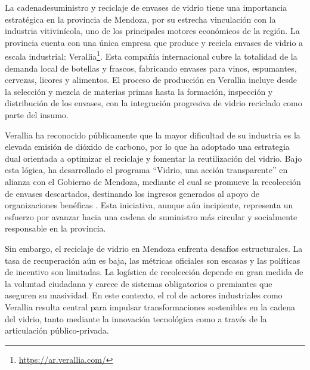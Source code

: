 La \gls{cadenadesuministro} y reciclaje de envases de vidrio tiene una importancia estratégica en la provincia de Mendoza, por su estrecha vinculación con la industria vitivinícola, uno de los principales motores económicos de la región. La provincia cuenta con una única empresa que produce y recicla envases de vidrio a escala industrial: Verallia\footnote{\url{https://ar.verallia.com/}}. Esta compañía internacional cubre la totalidad de la demanda local de botellas y frascos, fabricando envases para vinos, espumantes, cervezas, licores y alimentos. El proceso de producción en Verallia incluye desde la selección y mezcla de materias primas hasta la formación, inspección y distribución de los envases, con la integración progresiva de vidrio reciclado como parte del insumo.

Verallia ha reconocido públicamente que la mayor dificultad de su industria es la elevada emisión de dióxido de carbono, por lo que ha adoptado una estrategia dual orientada a optimizar el reciclaje y fomentar la reutilización del vidrio. Bajo esta lógica, ha desarrollado el programa ``Vidrio, una acción transparente'' en alianza con el Gobierno de Mendoza, mediante el cual se promueve la recolección de envases descartados, destinando los ingresos generados al apoyo de organizaciones benéficas \cite{vidriotransparente2024mendoza}. Esta iniciativa, aunque aún incipiente, representa un esfuerzo por avanzar hacia una cadena de suministro más circular y socialmente responsable en la provincia.

Sin embargo, el reciclaje de vidrio en Mendoza enfrenta desafíos estructurales. La tasa de recuperación aún es baja, las métricas oficiales son escasas y las políticas de incentivo son limitadas. La logística de recolección depende en gran medida de la voluntad ciudadana y carece de sistemas obligatorios o premiantes que aseguren su masividad. En este contexto, el rol de actores industriales como Verallia resulta central para impulsar transformaciones sostenibles en la cadena del vidrio, tanto mediante la innovación tecnológica como a través de la articulación público-privada.

